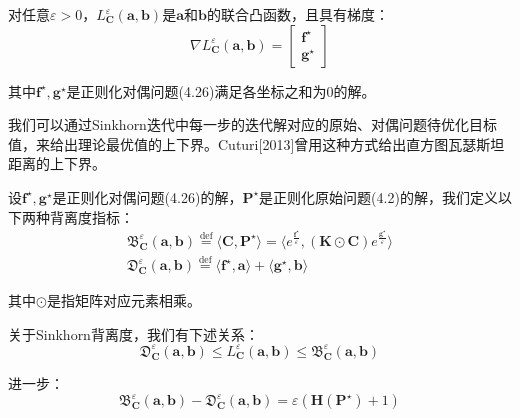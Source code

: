 \documentclass[cn,10pt,math=newtx,citestyle=gb7714-2015,bibstyle=gb7714-2015]{elegantbook}
\begin{document}
\begin{proposition}
    对任意$\varepsilon>0$，$L_\mathbf{C}^\varepsilon(\mathbf{a,b})$是$\mathbf{a}$和$\mathbf{b}$的联合凸函数，且具有梯度：
    \begin{equation*}
        \nabla L_\mathbf{C}^\varepsilon (\mathbf{a,b}) = \begin{bmatrix}
            \mathbf{f}^\star \\ \mathbf{g}^\star
        \end{bmatrix}
    \end{equation*}
    
    其中$\mathbf{f}^\star,\mathbf{g}^\star$是正则化对偶问题(4.26)满足各坐标之和为$0$的解。
\end{proposition}

我们可以通过Sinkhorn迭代中每一步的迭代解对应的原始、对偶问题待优化目标值，来给出理论最优值的上下界。Cuturi[2013]曾用这种方式给出直方图瓦瑟斯坦距离的上下界。

\begin{definition}[Sinkhorn背离度]
设$\mathbf{f}^\star,\mathbf{g}^\star$是正则化对偶问题(4.26)的解，$\mathbf{P}^\star$是正则化原始问题(4.2)的解，我们定义以下两种背离度指标：
\begin{align*}
    \mathfrak{B}_\mathbf{C}^\varepsilon(\mathbf{a,b}) \overset{\text{def}}{=} \langle \mathbf{C,P}^\star \rangle = \langle e^{\frac{\mathbf{f}^\star}{\varepsilon}}, (\mathbf{K}\odot \mathbf{C})e^{\frac{\mathbf{g}^\star}{\varepsilon}} \rangle \\
    \mathfrak{D}_\mathbf{C}^\varepsilon(\mathbf{a,b}) \overset{\text{def}}{=} \langle \mathbf{f}^\star, \mathbf{a} \rangle + \langle \mathbf{g}^\star, \mathbf{b} \rangle
\end{align*}

其中$\odot$是指矩阵对应元素相乘。
\end{definition}

\begin{proposition}[正则化问题解的上下界估计]
    关于Sinkhorn背离度，我们有下述关系：
    \begin{equation*}
        \mathfrak{D}_\mathbf{C}^\varepsilon(\mathbf{a,b}) \leq L_\mathbf{C}^\varepsilon(\mathbf{a,b}) \leq \mathfrak{B}_\mathbf{C}^\varepsilon(\mathbf{a,b})
    \end{equation*}
    
    进一步：
    \begin{equation}
        \label{4.42}
        \mathfrak{B}_\mathbf{C}^\varepsilon(\mathbf{a,b}) - \mathfrak{D}_\mathbf{C}^\varepsilon(\mathbf{a,b}) = \varepsilon(\mathbf{H}(\mathbf{P}^\star)+1)
    \end{equation}
\end{proposition}
\end{document}
